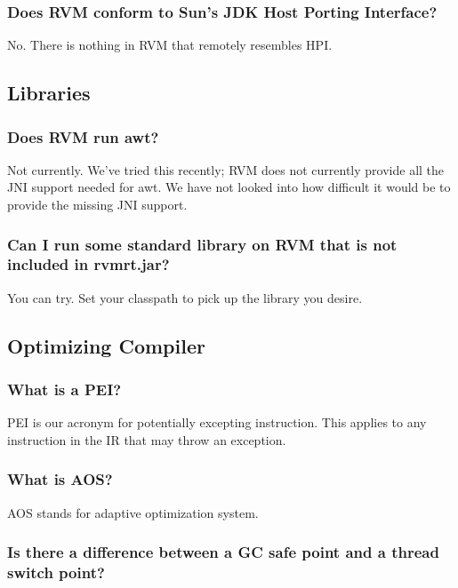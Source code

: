 \subsubsection{Does RVM conform to Sun's JDK Host Porting Interface?}

No. There is nothing in RVM that remotely resembles HPI.

\JavaTMFooter

\AIXPPCTMFooter

\subsection{Libraries}

\subsubsection{Does RVM run awt?}

Not currently.  We've tried this recently; RVM does not currently provide
all the JNI support needed for awt.  We have not looked into how difficult
it would be to provide the missing JNI support.

\subsubsection{Can I run some standard library on RVM that is not included
in rvmrt.jar?}

You can try.  Set your classpath to pick up the library you desire.

\subsection{Optimizing Compiler}

\subsubsection{What is a PEI?}
PEI is our acronym for potentially excepting instruction.  This applies to
any instruction in the IR that may throw an exception.

\subsubsection{What is AOS?}
AOS stands for adaptive optimization system.

\subsubsection{Is there a difference between a GC safe point and a thread
switch point?}

